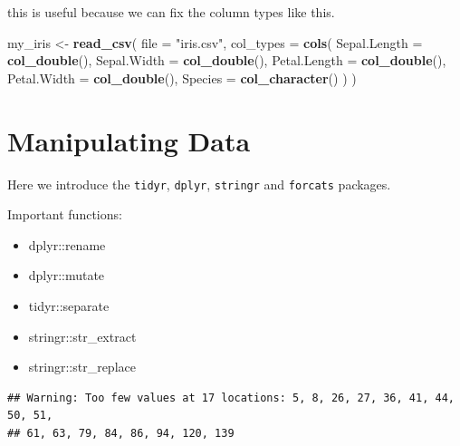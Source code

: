 \documentclass[]{book}
\newenvironment{Shaded}{\begin{snugshade}}{\end{snugshade}}
\newcommand{\KeywordTok}[1]{\textcolor[rgb]{0.13,0.29,0.53}{\textbf{#1}}}
\newcommand{\DataTypeTok}[1]{\textcolor[rgb]{0.13,0.29,0.53}{#1}}
\newcommand{\CharTok}[1]{\textcolor[rgb]{0.31,0.60,0.02}{#1}}
\newcommand{\StringTok}[1]{\textcolor[rgb]{0.31,0.60,0.02}{#1}}
\newcommand{\OperatorTok}[1]{\textcolor[rgb]{0.81,0.36,0.00}{\textbf{#1}}}
\newcommand{\NormalTok}[1]{#1}
\providecommand{\tightlist}{%
  \setlength{\itemsep}{0pt}\setlength{\parskip}{0pt}}
\theoremstyle{definition}
\theoremstyle{definition}
\theoremstyle{definition}
\theoremstyle{remark}
\begin{document}
this is useful because we can fix the column types like this.

\begin{Shaded}
\begin{Highlighting}[]
\NormalTok{my_iris <-}\StringTok{ }\KeywordTok{read_csv}\NormalTok{(}
    \DataTypeTok{file =} \StringTok{"iris.csv"}\NormalTok{,}
    \DataTypeTok{col_types =} \KeywordTok{cols}\NormalTok{(}
      \DataTypeTok{Sepal.Length =} \KeywordTok{col_double}\NormalTok{(),}
      \DataTypeTok{Sepal.Width =} \KeywordTok{col_double}\NormalTok{(),}
      \DataTypeTok{Petal.Length =} \KeywordTok{col_double}\NormalTok{(),}
      \DataTypeTok{Petal.Width =} \KeywordTok{col_double}\NormalTok{(),}
      \DataTypeTok{Species =} \KeywordTok{col_character}\NormalTok{()}
\NormalTok{    )}
\NormalTok{)}
\end{Highlighting}
\end{Shaded}

\chapter{Manipulating Data}\label{manipulating-data}

Here we introduce the \texttt{tidyr}, \texttt{dplyr}, \texttt{stringr}
and \texttt{forcats} packages.

Important functions:

\begin{itemize}
\tightlist
\item
  dplyr::rename
\item
  dplyr::mutate
\item
  tidyr::separate
\item
  stringr::str\_extract
\item
  stringr::str\_replace
\end{itemize}

\begin{Shaded}
\end{Shaded}

\begin{verbatim}
## Warning: Too few values at 17 locations: 5, 8, 26, 27, 36, 41, 44, 50, 51,
## 61, 63, 79, 84, 86, 94, 120, 139
\end{verbatim}
\end{document}
